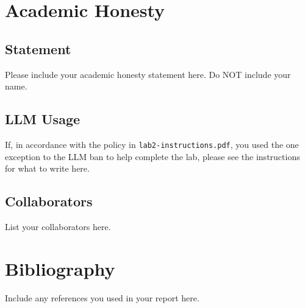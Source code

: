 \documentclass[10pt,letterpaper]{article}
\begin{document}
\section{Academic Honesty}\label{academic-integrity-statement}
\subsection{Statement}
Please include your academic honesty statement here. Do NOT include your name.
\subsection{LLM Usage}
If, in accordance with the policy in \texttt{lab2-instructions.pdf}, you used the one exception to the LLM ban to help complete the lab, please see the instructions for what to write here.
\subsection{Collaborators}
List your collaborators here.
\section{Bibliography}
Include any references you used in your report here.
\end{document}
